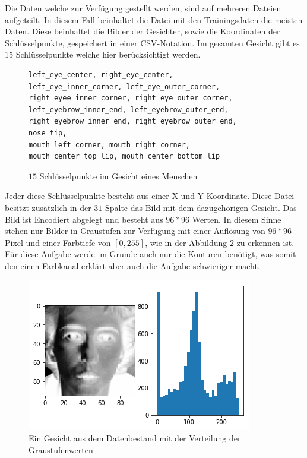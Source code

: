 Die Daten welche zur Verfügung gestellt werden, sind auf mehreren Dateien aufgeteilt. 
In diesem Fall beinhaltet die Datei mit den Trainingsdaten die meisten Daten. 
Diese beinhaltet die Bilder der Gesichter, sowie die Koordinaten der Schlüsselpunkte, gespeichert in einer CSV-Notation.
Im gesamten Gesicht gibt es 15 Schlüsselpunkte welche hier berücksichtigt werden. 
\begin{figure}[ht!]
\lstset{language=Python}
\begin{lstlisting}
left_eye_center, right_eye_center, 
left_eye_inner_corner, left_eye_outer_corner, right_eyee_inner_corner, right_eye_outer_corner, 
left_eyebrow_inner_end, left_eyebrow_outer_end, right_eyebrow_inner_end, right_eyebrow_outer_end, 
nose_tip, 
mouth_left_corner, mouth_right_corner, 
mouth_center_top_lip, mouth_center_bottom_lip
\end{lstlisting}
	\caption{$15$ Schlüsselpunkte im Gesicht eines Menschen}
	\label{fig:15keypoints}
\end{figure}
Jeder diese Schlüsselpunkte besteht aus einer X und Y Koordinate. 
Diese Datei besitzt zusätzlich in der $31$ Spalte das Bild mit dem dazugehörigen Gesicht.
Das Bild ist Encodiert abgelegt und besteht aus $96 * 96$ Werten. 
In diesem Sinne stehen nur Bilder in Graustufen zur Verfügung mit einer Auflösung von $96 * 96$ Pixel und einer Farbtiefe von $[0, 255]$, wie in der Abbildung \ref{fig:ausgangsdaten} zu erkennen ist. 
Für diese Aufgabe werde im Grunde auch nur die Konturen benötigt, was somit den einen Farbkanal erklärt aber auch die Aufgabe schwieriger macht. 
\begin{figure}
	\centering
	\includegraphics[scale=0.75]{images/ausgangsDaten.png}
	\caption{Ein Gesicht aus dem Datenbestand mit der Verteilung der Graustufenwerten}
	\label{fig:ausgangsdaten}
\end{figure}
